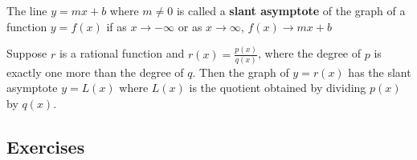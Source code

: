 \begin{definition}
    The line $y=mx+b$ where $m\neq 0$ is called a \textbf{slant asymptote} of the graph of a function $y=f(x)$ if as $x\to -\infty$ or as $x\to \infty$, $f(x) \to mx + b$
\end{definition}

\begin{theorem}
    Suppose $r$ is a rational function and $r(x) = \frac{p(x)}{q(x)}$, where the degree of $p$ is exactly one more than the degree of $q$. Then the graph of $y=r(x)$ has the slant asymptote $y=L(x)$ where $L(x)$ is the quotient obtained by dividing $p(x)$ by $q(x)$.
\end{theorem}

\subsection{Exercises}
